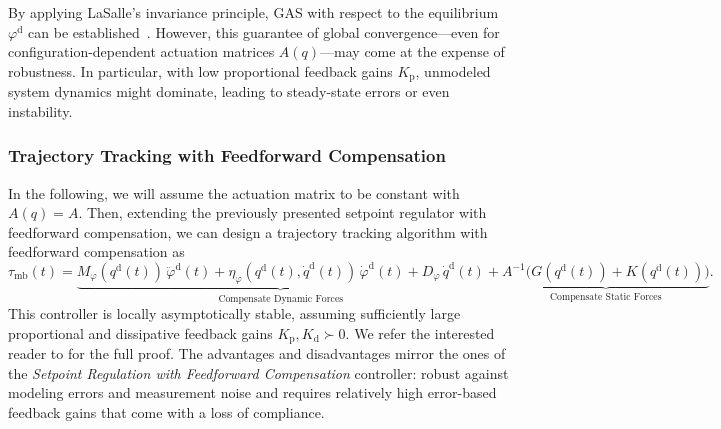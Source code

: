 By applying LaSalle’s invariance principle, \gls{GAS} with respect to the equilibrium $\varphi^\mathrm{d}$ can be established~\citep{khalil2002nonlinear}. However, this guarantee of global convergence—even for configuration-dependent actuation matrices $A(q)$—may come at the expense of robustness. In particular, with low proportional feedback gains $K_\mathrm{p}$, unmodeled system dynamics might dominate, leading to steady-state errors or even instability.

\subsubsection{Trajectory Tracking with Feedforward Compensation}
In the following, we will assume the actuation matrix to be constant with $A(q) = A$. Then, extending the previously presented setpoint regulator with feedforward compensation, we can design a trajectory tracking algorithm with feedforward compensation as~\citep{kelly1994pd, della2023model}
\begin{equation}
    \tau_\mathrm{mb}(t) =  \underbrace{M_\varphi(q^\mathrm{d}(t)) \, \ddot{\varphi}^\mathrm{d}(t) + \eta_\varphi(q^\mathrm{d}(t),\dot{q}^\mathrm{d}(t)) \, \dot{\varphi}^\mathrm{d}(t) + D_\varphi \, \dot{q}^\mathrm{d}(t)}_\text{Compensate Dynamic Forces} + \underbrace{ A^{-1} \big ( G(q^\mathrm{d}(t)) + K(q^\mathrm{d}(t)) \big )}_\text{Compensate Static Forces}.
\end{equation}
This controller is locally asymptotically stable, assuming sufficiently large proportional and dissipative feedback gains $K_\mathrm{p}, K_\mathrm{d} \succ 0$.
We refer the interested reader to \citet{kelly1994pd, della2023model} for the full proof.
The advantages and disadvantages mirror the ones of the \emph{Setpoint Regulation with Feedforward Compensation} controller: robust against modeling errors and measurement noise and requires relatively high error-based feedback gains that come with a loss of compliance.

